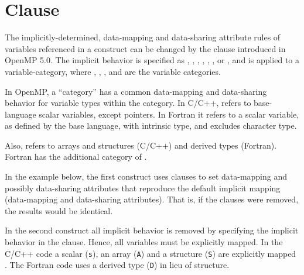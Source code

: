 \pagebreak
\section{ Clause}
\label{sec:defaultmap}

The implicitly-determined, data-mapping and data-sharing attribute
rules of variables referenced in a  construct can be
changed by the  clause introduced in OpenMP 5.0.
The implicit behavior is specified as
, , , ,
, ,  or ,
and is applied to a variable-category, where
, , ,
and  are the variable categories. 

In OpenMP, a ``category'' has a common data-mapping and data-sharing 
behavior for variable types within the category.
In C/C++,  refers to base-language scalar variables, except pointers.
In Fortran it refers to a scalar variable, as defined by the base language, 
with intrinsic type, and excludes character type.

Also,  refers to arrays and structures (C/C++) and
derived types (Fortran). Fortran has the additional category of .

In the example below, the first  construct uses  
clauses to set data-mapping and possibly data-sharing attributes that reproduce 
the default implicit mapping (data-mapping and data-sharing attributes).  That is, 
if the  clauses were removed, the results would be identical.

In the second  construct all implicit behavior is removed
by specifying the  implicit behavior in the  clause.
Hence, all variables must be explicitly mapped.  
In the C/C++ code a scalar (\texttt{s}), an array (\texttt{A}) and a structure 
(\texttt{S}) are explicitly mapped .  
The Fortran code uses a derived type (\texttt{D}) in lieu of structure.

